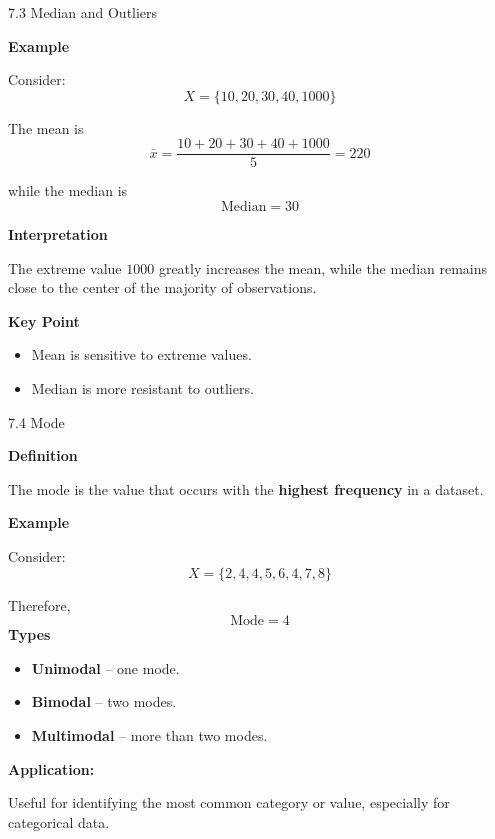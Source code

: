 \begin{frame}{7.3 Median and Outliers}

\textbf{Example}

Consider:
\[
X=\{10,20,30,40,1000\}
\]

The mean is
\[
\bar{x}
=
\frac{10+20+30+40+1000}{5}
=
220
\]

while the median is
\[
\text{Median}=30
\]

\vspace{0.1cm}
\textbf{Interpretation}

The extreme value $1000$ greatly increases the mean, while the
median remains close to the center of the majority of observations.

\textbf{Key Point}

\begin{itemize}
    \item Mean is sensitive to extreme values.
    \item Median is more resistant to outliers.
\end{itemize}

\end{frame}



\begin{frame}{7.4 Mode}

\textbf{Definition}

The mode is the value that occurs with the \textbf{highest frequency}
in a dataset.

\textbf{Example}

Consider:
\[
X=\{2,4,4,5,6,4,7,8\}
\]

Therefore,
\[
\boxed{\text{Mode}=4}
\]
\textbf{Types}
\begin{itemize}
    \item \textbf{Unimodal} -- one mode.
    \item \textbf{Bimodal} -- two modes.
    \item \textbf{Multimodal} -- more than two modes.
\end{itemize}

\textbf{Application:}

Useful for identifying the most common category or value,
especially for categorical data.

\end{frame}



